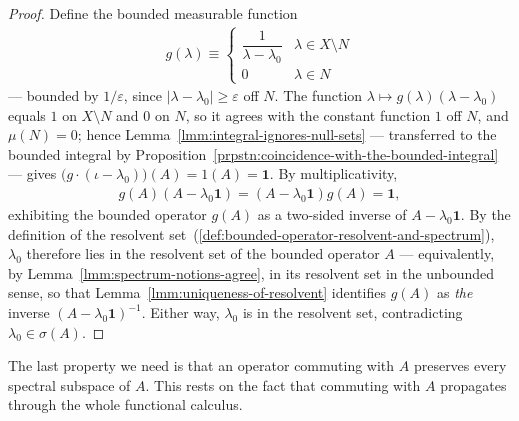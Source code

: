 \begin{proof}
Define the bounded measurable function
\begin{align}
    g(\lambda) \equiv \begin{cases} \dfrac{1}{\lambda-\lambda_0} & \lambda \in X \setminus N \\[4pt] 0 & \lambda \in N \end{cases}
\end{align}
— bounded by $1/\varepsilon$, since $\lvert \lambda - \lambda_0 \rvert \ge \varepsilon$ off $N$. The function $\lambda \mapsto g(\lambda)(\lambda-\lambda_0)$ equals $1$ on $X \setminus N$ and $0$ on $N$, so it agrees with the constant function $1$ off $N$, and $\mu(N) = 0$; hence Lemma~\ref{lmm:integral-ignores-null-sets} — transferred to the bounded integral by Proposition~\ref{prpstn:coincidence-with-the-bounded-integral} — gives $\big( g\cdot(\iota-\lambda_0) \big)(A) = 1(A) = \mathbf{1}$. By multiplicativity,
\begin{align}
    g(A)(A - \lambda_0\mathbf{1}) = (A-\lambda_0\mathbf{1})g(A) = \mathbf{1},
\end{align}
exhibiting the bounded operator $g(A)$ as a two-sided inverse of $A - \lambda_0\mathbf{1}$. By the definition of the resolvent set~(\ref{def:bounded-operator-resolvent-and-spectrum}), $\lambda_0$ therefore lies in the resolvent set of the bounded operator $A$ — equivalently, by Lemma~\ref{lmm:spectrum-notions-agree}, in its resolvent set in the unbounded sense, so that Lemma~\ref{lmm:uniqueness-of-resolvent} identifies $g(A)$ as \textit{the} inverse $(A-\lambda_0\mathbf{1})^{-1}$. Either way, $\lambda_0$ is in the resolvent set, contradicting $\lambda_0 \in \sigma(A)$.
\end{proof}

The last property we need is that an operator commuting with $A$ preserves every spectral subspace of $A$. This rests on the fact that commuting with $A$ propagates through the whole functional calculus.

